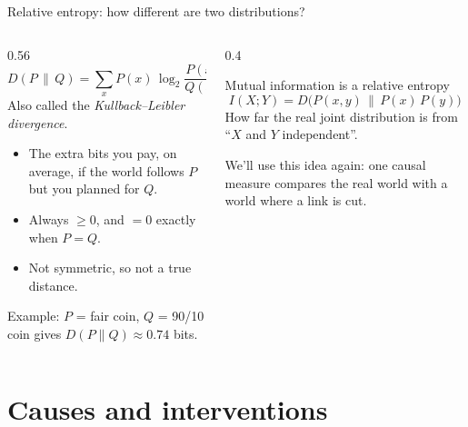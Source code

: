 \documentclass[aspectratio=169,11pt,xcolor={table}]{beamer}
\newcommand{\aside}[1]{{\color{muted}\small #1}}
\begin{document}
\begin{frame}{Relative entropy: how different are two distributions?}
  \begin{columns}[c]
    \begin{column}{0.56\textwidth}
      \[ D(P \,\|\, Q) = \sum_x P(x)\, \log_2 \frac{P(x)}{Q(x)} \]
      Also called the \emph{Kullback--Leibler divergence}.
      \begin{itemize}
        \item The extra bits you pay, on average, if the world follows $P$ but you planned for $Q$.
        \item Always $\ge 0$, and $= 0$ exactly when $P = Q$.
        \item Not symmetric, so not a true distance.
      \end{itemize}
      \medskip
      Example: $P$ = fair coin, $Q$ = 90/10 coin gives $D(P\|Q) \approx 0.74$ bits.
    \end{column}
    \begin{column}{0.4\textwidth}
      \begin{block}{Mutual information is a relative entropy}
        \[ I(X;Y) = D\big(P(x,y) \,\|\, P(x)\,P(y)\big) \]
        How far the real joint distribution is from ``$X$ and $Y$ independent''.
      \end{block}
      \smallskip
      \aside{We'll use this idea again: one causal measure compares the real world with a world where a link is cut.}
    \end{column}
  \end{columns}
\end{frame}

\section{Causes and interventions}
\end{document}

